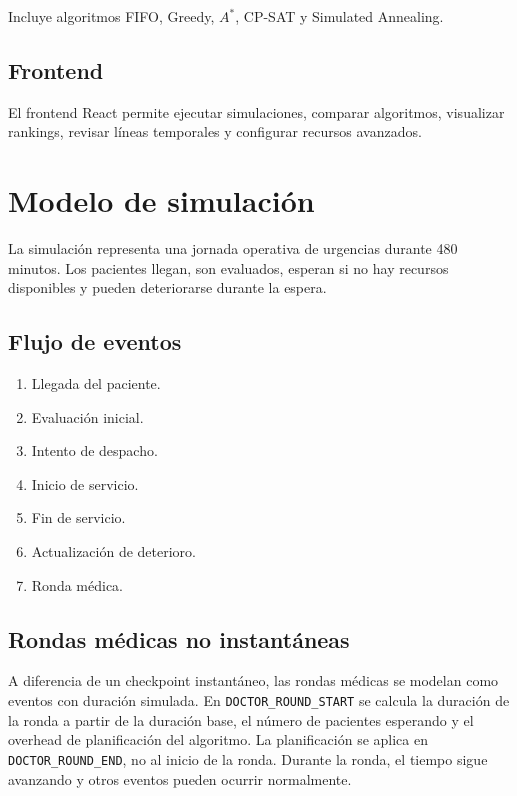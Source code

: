 \documentclass[12pt,a4paper]{article}
\begin{document}
Incluye algoritmos FIFO, Greedy, $A^*$, CP-SAT y Simulated Annealing.

\subsection{Frontend}

El frontend React permite ejecutar simulaciones, comparar algoritmos, visualizar rankings, revisar líneas temporales y configurar recursos avanzados.

\section{Modelo de simulación}

La simulación representa una jornada operativa de urgencias durante 480 minutos. Los pacientes llegan, son evaluados, esperan si no hay recursos disponibles y pueden deteriorarse durante la espera.

\subsection{Flujo de eventos}

\begin{enumerate}
    \item Llegada del paciente.
    \item Evaluación inicial.
    \item Intento de despacho.
    \item Inicio de servicio.
    \item Fin de servicio.
    \item Actualización de deterioro.
    \item Ronda médica.
\end{enumerate}

\subsection{Rondas médicas no instantáneas}

A diferencia de un checkpoint instantáneo, las rondas médicas se modelan como eventos con duración simulada. En \texttt{DOCTOR\_ROUND\_START} se calcula la duración de la ronda a partir de la duración base, el número de pacientes esperando y el overhead de planificación del algoritmo. La planificación se aplica en \texttt{DOCTOR\_ROUND\_END}, no al inicio de la ronda. Durante la ronda, el tiempo sigue avanzando y otros eventos pueden ocurrir normalmente.
\end{document}
